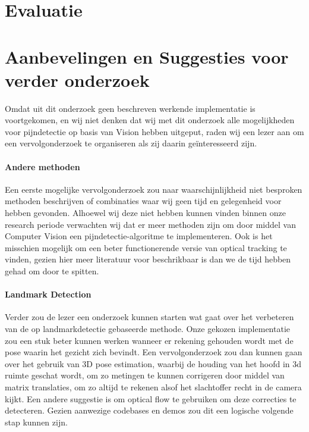 \documentclass[11pt]{article}
\begin{document}
    \section{Evaluatie}\label{sec:evaluatie2}







    \section{Aanbevelingen en Suggesties voor verder onderzoek}\label{sec:aanbevelingen2}
    Omdat uit dit onderzoek geen beschreven werkende implementatie is voortgekomen, en wij niet denken dat wij met dit onderzoek alle
    mogelijkheden voor pijndetectie op basis van Vision hebben uitgeput, raden wij een lezer
    aan om een vervolgonderzoek te organiseren als zij daarin geïnteresseerd zijn. 


    \paragraph{Andere methoden} Een eerste mogelijke vervolgonderzoek zou naar waarschijnlijkheid niet besproken methoden beschrijven of combinaties waar wij geen tijd en gelegenheid voor hebben gevonden.
    Alhoewel wij deze niet hebben kunnen vinden binnen onze research periode verwachten wij dat er meer methoden zijn om door middel van Computer Vision een pijndetectie-algoritme te implementeren. 
    Ook is het misschien mogelijk om een beter functionerende versie van optical tracking te vinden, gezien hier meer literatuur voor beschrikbaar is dan we de tijd hebben gehad om door te spitten.

    \paragraph{Landmark Detection} Verder zou de lezer een onderzoek kunnen starten wat
    gaat over het verbeteren van de op landmarkdetectie gebaseerde methode. Onze gekozen implementatie zou
    een stuk beter kunnen werken wanneer er rekening gehouden wordt met de pose waarin het gezicht zich bevindt.
    Een vervolgonderzoek zou dan kunnen gaan over het gebruik van 3D pose estimation, waarbij de houding van het hoofd
    in 3d ruimte geschat wordt, om zo metingen te kunnen corrigeren door middel van matrix translaties, om zo altijd te
    rekenen alsof het slachtoffer recht in de camera kijkt.
    Een andere suggestie is om optical flow te gebruiken om deze correcties te detecteren.
    Gezien aanwezige codebases en demos zou dit een logische volgende stap kunnen zijn.
\end{document}
